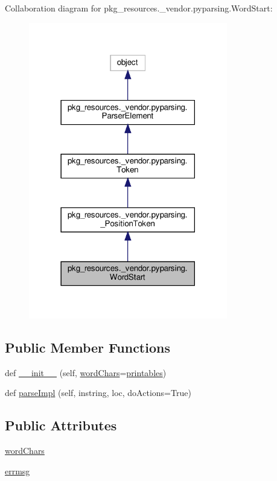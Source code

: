 Collaboration diagram for pkg\+\_\+resources.\+\_\+vendor.\+pyparsing.\+Word\+Start\+:
\nopagebreak
\begin{figure}[H]
\begin{center}
\leavevmode
\includegraphics[width=246pt]{classpkg__resources_1_1__vendor_1_1pyparsing_1_1WordStart__coll__graph}
\end{center}
\end{figure}
\subsection*{Public Member Functions}
\begin{DoxyCompactItemize}
\item 
def \hyperlink{classpkg__resources_1_1__vendor_1_1pyparsing_1_1WordStart_a831062c51876abb4ae5547bc3106a1cd}{\+\_\+\+\_\+init\+\_\+\+\_\+} (self, \hyperlink{classpkg__resources_1_1__vendor_1_1pyparsing_1_1WordStart_ab890bc5bfb9970e5a2ff4394b4a52bf0}{word\+Chars}=\hyperlink{namespacepkg__resources_1_1__vendor_1_1pyparsing_af6012db114d431b92334582e9f73eae2}{printables})
\item 
def \hyperlink{classpkg__resources_1_1__vendor_1_1pyparsing_1_1WordStart_a3527eebc17d62454214d6bf543db986b}{parse\+Impl} (self, instring, loc, do\+Actions=True)
\end{DoxyCompactItemize}
\subsection*{Public Attributes}
\begin{DoxyCompactItemize}
\item 
\hyperlink{classpkg__resources_1_1__vendor_1_1pyparsing_1_1WordStart_ab890bc5bfb9970e5a2ff4394b4a52bf0}{word\+Chars}
\item 
\hyperlink{classpkg__resources_1_1__vendor_1_1pyparsing_1_1WordStart_a66ee823834a600df42eedf637704b0e5}{errmsg}
\end{DoxyCompactItemize}

